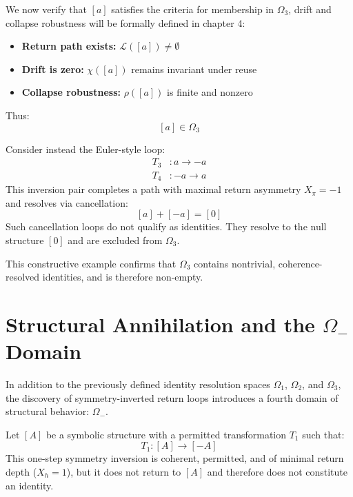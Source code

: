 \begin{definition} \label{def:omega3-verification}
We now verify that $[a]$ satisfies the criteria for membership in $\Omega_3$, drift and collapse robustness will be formally defined in chapter 4:
\begin{itemize}
  \item \textbf{Return path exists:} $\mathcal{L}([a]) \neq \emptyset$
  \item \textbf{Drift is zero:} $\chi([a])$ remains invariant under reuse
  \item \textbf{Collapse robustness:} $\rho([a])$ is finite and nonzero
\end{itemize}
Thus:
\begin{equation} \label{eq:a-in-omega3}
[a] \in \Omega_3
\end{equation}
\end{definition}

\begin{definition} \label{def:euler-inversion-exclusion}
Consider instead the Euler-style loop:
\begin{align}
T_3 &: a \rightarrow -a \label{eq:rule-t3} \\
T_4 &: -a \rightarrow a \label{eq:rule-t4}
\end{align}
This inversion pair completes a path with maximal return asymmetry $X_\pi = -1$ and resolves via cancellation:
\begin{equation} \label{eq:euler-cancellation-example}
[a] + [-a] = [0]
\end{equation}
Such cancellation loops do not qualify as identities. They resolve to the null structure $[0]$ and are excluded from $\Omega_3$.
\end{definition}

This constructive example confirms that $\Omega_3$ contains nontrivial, coherence-resolved identities, and is therefore non-empty.

\section{Structural Annihilation and the $\Omega_-$ Domain}

In addition to the previously defined identity resolution spaces $\Omega_1$, $\Omega_2$, and $\Omega_3$, the discovery of symmetry-inverted return loops introduces a fourth domain of structural behavior: $\Omega_-$.

\begin{definition} \label{def:symmetry-inversion}
Let $[A]$ be a symbolic structure with a permitted transformation $T_1$ such that:
\begin{equation} \label{eq:symmetry-inversion}
T_1 : [A] \rightarrow [-A]
\end{equation}
This one-step symmetry inversion is coherent, permitted, and of minimal return depth ($X_h = 1$), but it does not return to $[A]$ and therefore does not constitute an identity.
\end{definition}


